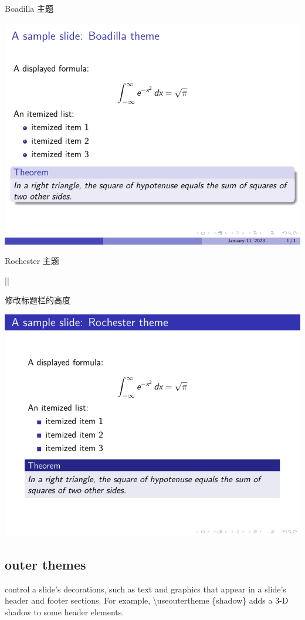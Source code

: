 \begin{column}{0.5\textwidth}
Boadilla 主题

\includegraphics{examples/beamer/beamertheme02.pdf}

Rochester 主题

||

修改标题栏的高度

\includegraphics{examples/beamer/beamertheme03.pdf}

\subsection{outer themes}

control a slide’s decorations, such as text and graphics that appear in a slide’s header and footer sections. For example, {\ttfamily \textbackslash useoutertheme \{shadow\}} adds a 3-D shadow to some header elements.


\end{column}
